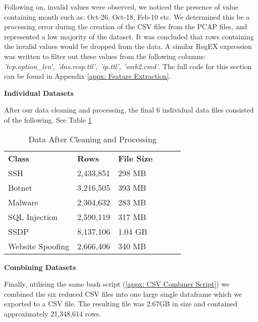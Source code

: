 \smallskip
Following on, invalid values were observed, we noticed the presence of value containing month such as: Oct-26, Oct-18, Feb-10 etc. We determined this be a processing error during the creation of the CSV files from the PCAP files, and represented a low majority of the dataset. It was concluded that rows containing the invalid values would be dropped from the data. A similar RegEX expression was written to filter out these values from the following columns: \textit{'tcp.option\_len', 'dns.resp.ttl', 'ip.ttl', 'smb2.cmd'}. The full code for this section can be found in Appendix \ref{appx: Feature Extraction}.

\medskip

\textbf{Individual Datasets}

\smallskip
After our data cleaning and processing, the final 6 individual data files consisted of the following. See Table \ref{tab:reduced_data}

\begin{table}[H]
\centering
\begin{tabular}{llllll}
\cline{1-3}
\textbf{Class}  & \textbf{Rows} & \textbf{File Size} &  &  &  \\ \cline{1-3}
SSH              & 2,433,851    & 298 MB               &  &  &  \\
Botnet           & 3,216,505     & 393 MB             &  &  &  \\
Malware          & 2,304,632     & 283 MB             &  &  &  \\
SQL Injection    & 2,590,119     & 317 MB             &  &  &  \\
SSDP             & 8,137,106     & 1.04 GB            &  &  &  \\
Website Spoofing & 2,666,406     & 340 MB            &  &  &  \\ \cline{1-3}
\end{tabular}
\caption{Data After Cleaning and Processing}
\label{tab:reduced_data}
\end{table}

\medskip

\textbf{Combining Datasets}

\smallskip
Finally, utilising the same bash script (\ref{appx: CSV Combiner Script}) we combined the six reduced CSV files into one large single dataframe which we exported to a CSV file. The resulting file was 2.67GB in size and contained approximately 21,348,614 rows. 
